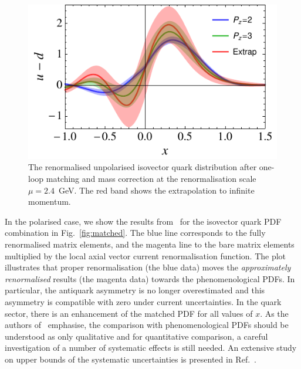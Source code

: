 \begin{figure}[t]
\centering
\includegraphics[width=.6\textwidth]{plots/pdf_nonorm}
\caption{\small The renormalised unpolarised isovector quark distribution after 
one-loop matching and mass correction at the renormalisation scale 
$\mu=2.4$~GeV. 
The red band shows the extrapolation to infinite momentum. 
} \label{fig:final_pdf}
\end{figure}

In the polarised case, we show the results from~\cite{Alexandrou:2017huk} 
for the isovector quark PDF combination in Fig.~\ref{fig:matched}. 
%
The blue line corresponds to the fully renormalised matrix elements, and the 
magenta line to the bare matrix elements multiplied by the local axial vector 
current renormalisation function.
%
The plot illustrates that proper renormalisation (the blue data) moves the 
{\it approximately renormalised} results (the magenta data) towards the 
phenomenological PDFs. 
%
In particular, the antiquark asymmetry is no longer overestimated and this 
asymmetry is compatible with zero under current uncertainties. 
%
In the quark sector, there is an enhancement of the matched PDF for all 
values of $x$. 
%
As the authors of~\cite{Alexandrou:2017huk} emphasise, the comparison 
with phenomenological PDFs should be understood as only qualitative 
and for quantitative comparison, a careful investigation of a number of 
systematic effects is still needed. 
%
An extensive study on upper bounds of the systematic uncertainties is presented 
in Ref.~\cite{Alexandrou:2017huk}.

